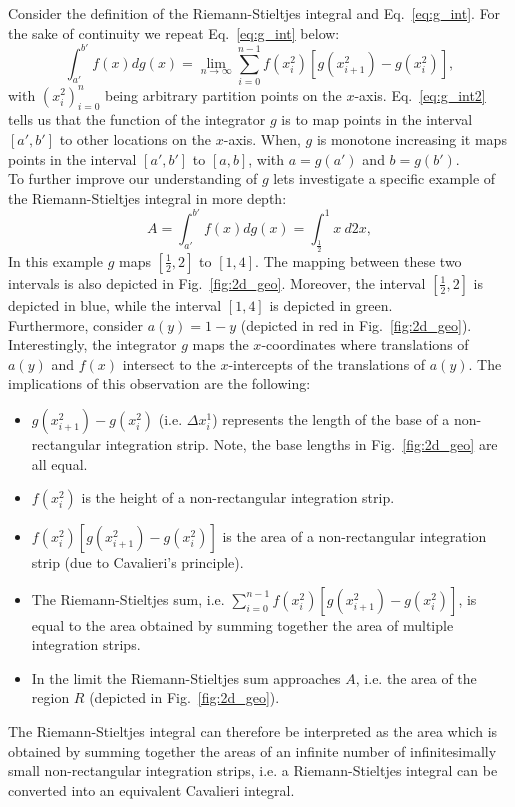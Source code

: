 \documentclass{article}
\theoremstyle{theorem}
\theoremstyle{definition}
\begin{document}
Consider the definition of the Riemann-Stieltjes integral and 
Eq.~\eqref{eq:g_int}. For the sake of continuity we repeat Eq.~\eqref{eq:g_int} below:
\begin{equation}
\label{eq:g_int2}
\int_{a'}^{b'} f(x) dg(x) =  \lim_{n \rightarrow \infty}\sum_{i=0}^{n-1} f(x_i^2)[g(x_{i+1}^2)-g(x_{i}^2)], 
\end{equation}
with $(x_i^2)_{i=0}^n$ being arbitrary partition points on the $x$-axis.
Eq.~\eqref{eq:g_int2} tells us that the function of the integrator $g$ is to map points in the interval $[a',b']$ to other 
locations on the $x$-axis. When, $g$ is monotone increasing it maps points in the interval $[a',b']$ to $[a,b]$,
with $a = g(a')$ and $b = g(b')$.\\

\noindent
To further improve our understanding of $g$ lets investigate a specific example of the Riemann-Stieltjes integral in more depth: 
\begin{equation}
A =\int_{a'}^{b'} f(x) dg(x)=\int_{\frac{1}{2}}^1 x~d2x, 
\end{equation}
In this example $g$ maps $[\frac{1}{2},2]$ to $[1,4]$. The mapping between these two intervals is also 
depicted in Fig.~\ref{fig:2d_geo}. Moreover, the interval $[\frac{1}{2},2]$ is depicted in blue,
while the interval $[1,4]$ is depicted in green.\\ 

\noindent
Furthermore, consider $a(y) = 1-y$ (depicted in red in Fig.~\ref{fig:2d_geo}). Interestingly, the integrator $g$ maps the $x$-coordinates where translations of $a(y)$ and $f(x)$ intersect to the $x$-intercepts of the translations of $a(y)$.
The implications of this observation are the following: 
\begin{itemize}
 \item $g(x_{i+1}^2)-g(x_{i}^2)$ (i.e. $\Delta x_i^1$) represents the length of the base of a non-rectangular integration strip. Note, the base lengths in Fig.~\ref{fig:2d_geo} are all equal.
 \item $f(x_i^2)$ is the height of a non-rectangular integration strip.
 \item $f(x_i^2)[g(x_{i+1}^2)-g(x_{i}^2)]$ is the area of a non-rectangular integration strip (due to Cavalieri's principle).
 \item The Riemann-Stieltjes sum, i.e. $\sum_{i=0}^{n-1} f(x_i^2)[g(x_{i+1}^2)-g(x_{i}^2)]$, is equal to the area obtained by summing together the area of multiple 
 integration strips.
 \item In the limit the Riemann-Stieltjes sum approaches $A$, i.e. the area of the region $R$ (depicted in Fig.~\ref{fig:2d_geo}). 
\end{itemize}
The Riemann-Stieltjes integral can therefore be interpreted as the area which is obtained by summing together the areas of an infinite number of infinitesimally small non-rectangular integration strips,
i.e. a Riemann-Stieltjes integral can be converted into an equivalent Cavalieri integral.\\
\end{document}
